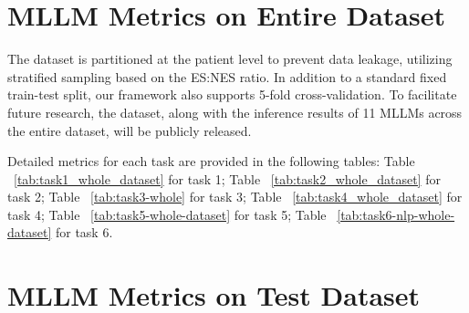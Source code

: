 \documentclass{article}
\theoremstyle{plain}
\theoremstyle{definition}
\theoremstyle{remark}
\begin{document}
\section{MLLM Metrics on Entire Dataset}
\label{sec:mllm_metrics_entire_data_supp}

The dataset is partitioned at the patient level to prevent data leakage, utilizing stratified sampling based on the ES:NES ratio. In addition to a standard fixed train-test split, our framework also supports 5-fold cross-validation. To facilitate future research, the dataset, along with the inference results of 11 MLLMs across the entire dataset, will be publicly released.

Detailed metrics for each task are provided in the following tables: Table ~\ref{tab:task1_whole_dataset} for task 1; Table ~\ref{tab:task2_whole_dataset} for task 2;
Table ~\ref{tab:task3-whole} for task 3;
Table ~\ref{tab:task4_whole_dataset} for task 4;
Table ~\ref{tab:task5-whole-dataset} for task 5;
Table ~\ref{tab:task6-nlp-whole-dataset} for task 6.





% 












% 

%




\section{MLLM Metrics on Test Dataset}
\label{sec:mllm_metrics_test_data_supp}



\end{document}
